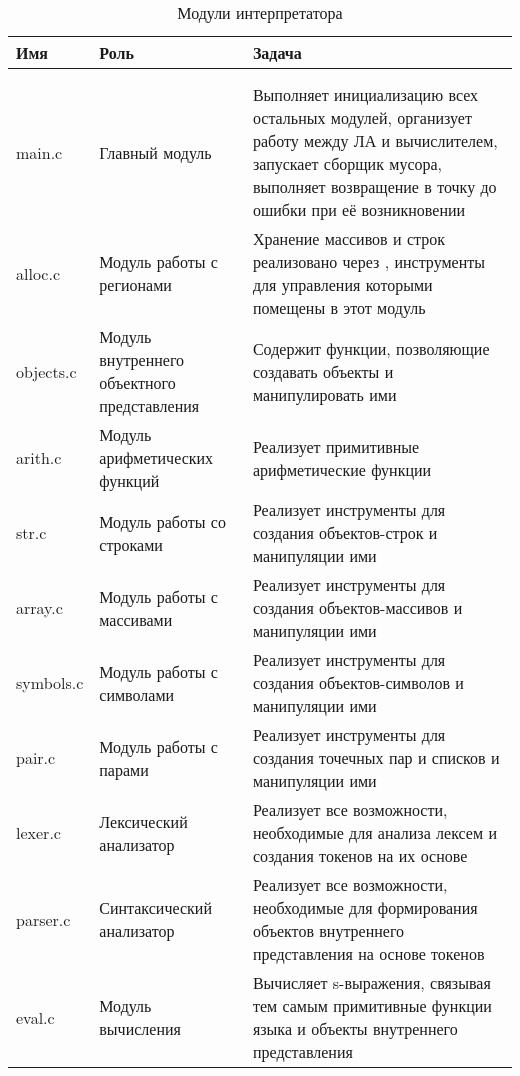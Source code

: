 \begin{xltabular}{\textwidth}{|l|p{4cm}|X|}
	\caption{Модули интерпретатора\label{modules:table}} \\ \hline
	\centrow Имя & \centrow Роль & \centrow Задача \\ \hline
	 &  &  \\ \hline
	\endfirsthead
	 &  &  \\ \hline
	\finishhead
	main.c & Главный модуль & Выполняет инициализацию всех остальных модулей, организует работу между ЛА и вычислителем, запускает сборщик мусора, выполняет возвращение в точку до ошибки при её возникновении \\ \hline
	alloc.c & Модуль работы с регионами & Хранение массивов и строк реализовано через , инструменты для управления которыми помещены в этот модуль \\ \hline
	objects.c & Модуль внутреннего объектного представления & Содержит функции, позволяющие создавать объекты и манипулировать ими \\ \hline
	arith.c & Модуль арифметических функций & Реализует примитивные арифметические функции \\ \hline
	str.c & Модуль работы со строками & Реализует инструменты для создания объектов-строк и манипуляции ими \\ \hline
	array.c & Модуль работы с массивами & Реализует инструменты для создания объектов-массивов и манипуляции ими \\ \hline
	symbols.c & Модуль работы с символами & Реализует инструменты для создания объектов-символов и манипуляции ими \\ \hline
	pair.c & Модуль работы с парами & Реализует инструменты для создания точечных пар и списков и манипуляции ими \\ \hline
	lexer.c & Лексический анализатор & Реализует все возможности, необходимые для анализа лексем и создания токенов на их основе \\ \hline
	parser.c & Синтаксический анализатор & Реализует все возможности, необходимые для формирования объектов внутреннего представления на основе токенов \\ \hline
	eval.c & Модуль вычисления & Вычисляет s-выражения, связывая тем самым примитивные функции языка и объекты внутреннего представления \\ \hline
\end{xltabular}

